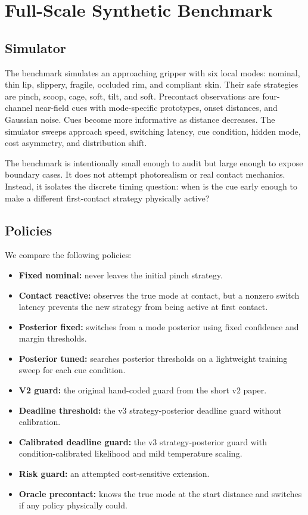 \documentclass{article}
\begin{document}
\section{Full-Scale Synthetic Benchmark}

\subsection{Simulator}

The benchmark simulates an approaching gripper with six local modes: nominal, thin lip, slippery, fragile, occluded rim, and compliant skin. Their safe strategies are pinch, scoop, cage, soft, tilt, and soft. Precontact observations are four-channel near-field cues with mode-specific prototypes, onset distances, and Gaussian noise. Cues become more informative as distance decreases. The simulator sweeps approach speed, switching latency, cue condition, hidden mode, cost asymmetry, and distribution shift.

The benchmark is intentionally small enough to audit but large enough to expose boundary cases. It does not attempt photorealism or real contact mechanics. Instead, it isolates the discrete timing question: when is the cue early enough to make a different first-contact strategy physically active?

\subsection{Policies}

We compare the following policies:
\begin{itemize}
\item \textbf{Fixed nominal:} never leaves the initial pinch strategy.
\item \textbf{Contact reactive:} observes the true mode at contact, but a nonzero switch latency prevents the new strategy from being active at first contact.
\item \textbf{Posterior fixed:} switches from a mode posterior using fixed confidence and margin thresholds.
\item \textbf{Posterior tuned:} searches posterior thresholds on a lightweight training sweep for each cue condition.
\item \textbf{V2 guard:} the original hand-coded guard from the short v2 paper.
\item \textbf{Deadline threshold:} the v3 strategy-posterior deadline guard without calibration.
\item \textbf{Calibrated deadline guard:} the v3 strategy-posterior guard with condition-calibrated likelihood and mild temperature scaling.
\item \textbf{Risk guard:} an attempted cost-sensitive extension.
\item \textbf{Oracle precontact:} knows the true mode at the start distance and switches if any policy physically could.
\end{itemize}
\end{document}
